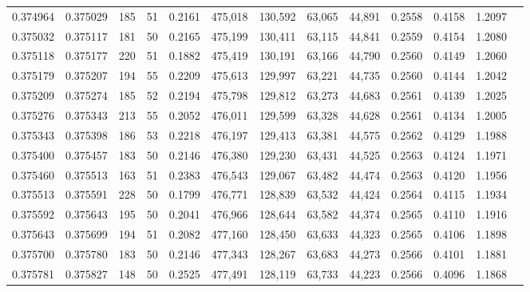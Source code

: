 \begin{tabular}{rrrrrrrrrrrrr}
0.374964 & 0.375029 &   185 &  51 &                                     0.2161 & 475,018 & 130,592 &  63,065 &  44,891 & 0.2558 & 0.4158 & 1.2097 \\
0.375032 & 0.375117 &   181 &  50 &                                     0.2165 & 475,199 & 130,411 &  63,115 &  44,841 & 0.2559 & 0.4154 & 1.2080 \\
0.375118 & 0.375177 &   220 &  51 &                                     0.1882 & 475,419 & 130,191 &  63,166 &  44,790 & 0.2560 & 0.4149 & 1.2060 \\
0.375179 & 0.375207 &   194 &  55 &                                     0.2209 & 475,613 & 129,997 &  63,221 &  44,735 & 0.2560 & 0.4144 & 1.2042 \\
0.375209 & 0.375274 &   185 &  52 &                                     0.2194 & 475,798 & 129,812 &  63,273 &  44,683 & 0.2561 & 0.4139 & 1.2025 \\
0.375276 & 0.375343 &   213 &  55 &                                     0.2052 & 476,011 & 129,599 &  63,328 &  44,628 & 0.2561 & 0.4134 & 1.2005 \\
0.375343 & 0.375398 &   186 &  53 &                                     0.2218 & 476,197 & 129,413 &  63,381 &  44,575 & 0.2562 & 0.4129 & 1.1988 \\
0.375400 & 0.375457 &   183 &  50 &                                     0.2146 & 476,380 & 129,230 &  63,431 &  44,525 & 0.2563 & 0.4124 & 1.1971 \\
0.375460 & 0.375513 &   163 &  51 &                                     0.2383 & 476,543 & 129,067 &  63,482 &  44,474 & 0.2563 & 0.4120 & 1.1956 \\
0.375513 & 0.375591 &   228 &  50 &                                     0.1799 & 476,771 & 128,839 &  63,532 &  44,424 & 0.2564 & 0.4115 & 1.1934 \\
0.375592 & 0.375643 &   195 &  50 &                                     0.2041 & 476,966 & 128,644 &  63,582 &  44,374 & 0.2565 & 0.4110 & 1.1916 \\
0.375643 & 0.375699 &   194 &  51 &                                     0.2082 & 477,160 & 128,450 &  63,633 &  44,323 & 0.2565 & 0.4106 & 1.1898 \\
0.375700 & 0.375780 &   183 &  50 &                                     0.2146 & 477,343 & 128,267 &  63,683 &  44,273 & 0.2566 & 0.4101 & 1.1881 \\
0.375781 & 0.375827 &   148 &  50 &                                     0.2525 & 477,491 & 128,119 &  63,733 &  44,223 & 0.2566 & 0.4096 & 1.1868 \\

\end{tabular}
